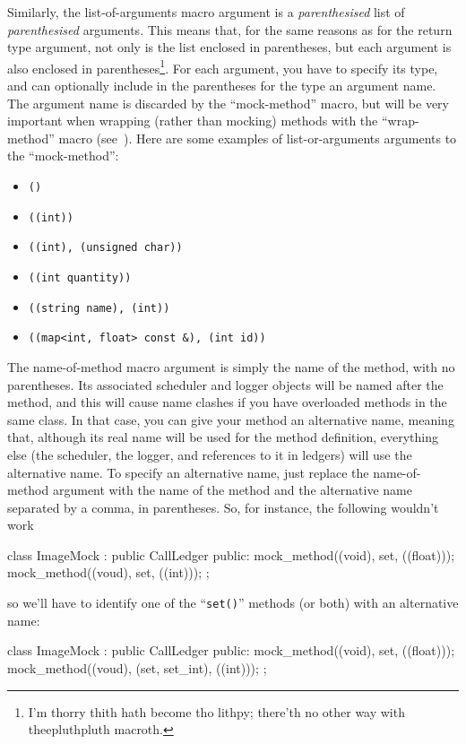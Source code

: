 \documentclass[twoside, a4paper, article]{memoir}
\begin{document}
Similarly, the list-of-arguments macro argument is a \emph{parenthesised} list
of \emph{parenthesised} arguments.  This means that, for the same reasons as
for the return type argument, not only is the list enclosed in parentheses, but
each argument is also enclosed in parentheses\footnote{I'm thorry thith hath
  become tho lithpy; there'th no other way with theepluthpluth macroth.}.  For
each argument, you have to specify its type, and can optionally include in the
parentheses for the type an argument name.  The argument name is discarded by
the ``mock-method'' macro, but will be very important when wrapping (rather
than mocking) methods with the ``wrap-method'' macro
(see~).  Here are some examples of list-or-arguments
arguments to the ``mock-method'':
\begin{itemize}
\item \texttt{()}
\item \texttt{((int))}
\item \texttt{((int), (unsigned char))}
\item \texttt{((int quantity))}
\item \texttt{((string name), (int))}
\item \texttt{((map<int, float> const \&), (int id))}
\end{itemize}

The name-of-method macro argument is simply the name of the method, with no
parentheses.  Its associated scheduler and logger objects will be named after
the method, and this will cause name clashes if you have overloaded methods in
the same class.  In that case, you can give your method an alternative name,
meaning that, although its real name will be used for the method definition,
everything else (the scheduler, the logger, and references to it in ledgers)
will use the alternative name.  To specify an alternative name, just replace
the name-of-method argument with the name of the method and the alternative
name separated by a comma, in parentheses.  So, for instance, the following
wouldn't work
\begin{cpplisting}
class ImageMock
  : public CallLedger {
public:
  mock_method((void), set, ((float)));
  mock_method((voud), set, ((int)));
};
\end{cpplisting}
so we'll have to identify one of the ``\texttt{set()}'' methods (or both) with
an alternative name:
\begin{cpplisting}
class ImageMock
  : public CallLedger {
public:
  mock_method((void), set, ((float)));
  mock_method((voud), (set, set_int), ((int)));
};
\end{cpplisting}
\end{document}
